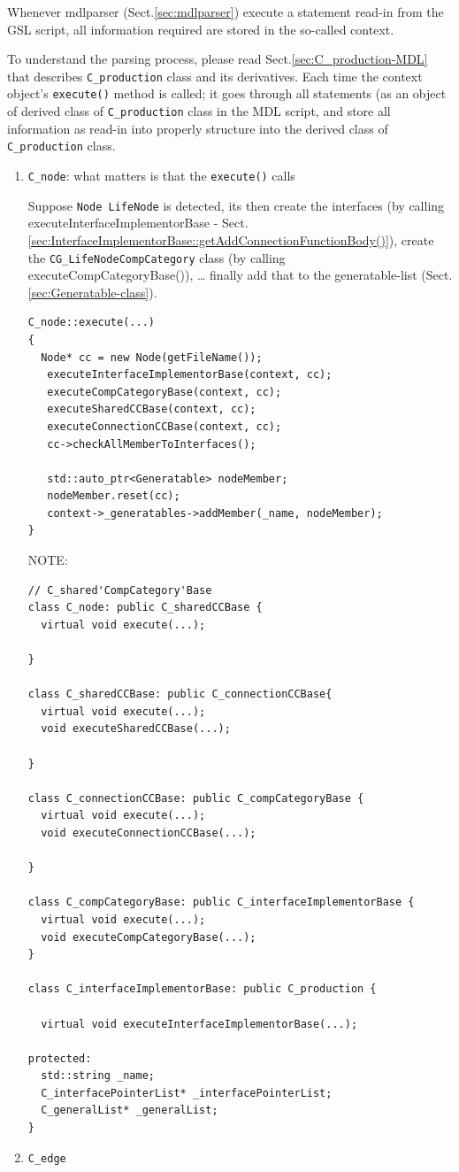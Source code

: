 Whenever mdlparser (Sect.\ref{sec:mdlparser}) execute a statement read-in from
the GSL script, all information required are stored in the so-called context.


To understand the parsing process, please read Sect.\ref{sec:C_production-MDL}
that describes \verb!C_production! class and its derivatives.
Each time the context object's \verb!execute()! method is called; it goes
through all statements (as an object of derived class of \verb!C_production!
class in the MDL script, and store all information as read-in into properly
structure into the derived class of \verb!C_production! class.

\begin{enumerate}
  \item \verb!C_node!: what matters is that the \verb!execute()! calls 
  
Suppose \verb!Node LifeNode! is detected, its then create the interfaces 
(by calling executeInterfaceImplementorBase - Sect.\ref{sec:InterfaceImplementorBase::getAddConnectionFunctionBody()}),
create the \verb!CG_LifeNodeCompCategory! class (by calling executeCompCategoryBase()), \ldots
finally add that to the generatable-list (Sect.\ref{sec:Generatable-class}).

\begin{verbatim}
C_node::execute(...)
{
  Node* cc = new Node(getFileName());
   executeInterfaceImplementorBase(context, cc);
   executeCompCategoryBase(context, cc);
   executeSharedCCBase(context, cc);
   executeConnectionCCBase(context, cc);
   cc->checkAllMemberToInterfaces();

   std::auto_ptr<Generatable> nodeMember;
   nodeMember.reset(cc);
   context->_generatables->addMember(_name, nodeMember);
}
\end{verbatim}


NOTE:
\begin{verbatim}
// C_shared'CompCategory'Base
class C_node: public C_sharedCCBase {
  virtual void execute(...);

}

class C_sharedCCBase: public C_connectionCCBase{
  virtual void execute(...);
  void executeSharedCCBase(...);

}

class C_connectionCCBase: public C_compCategoryBase {
  virtual void execute(...);
  void executeConnectionCCBase(...);

}

class C_compCategoryBase: public C_interfaceImplementorBase {
  virtual void execute(...);
  void executeCompCategoryBase(...);
}

class C_interfaceImplementorBase: public C_production {

  virtual void executeInterfaceImplementorBase(...);
  
protected:
  std::string _name;
  C_interfacePointerList* _interfacePointerList;
  C_generalList* _generalList;
}
\end{verbatim}

  \item \verb!C_edge! 
\end{enumerate}

